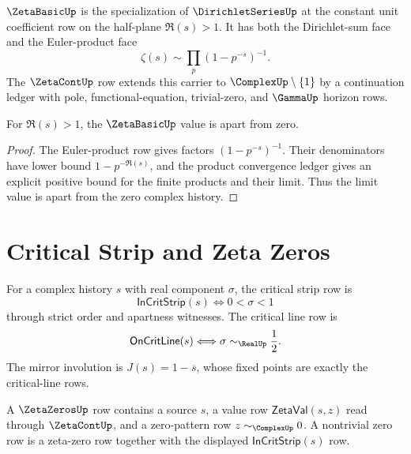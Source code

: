 \begin{definition}
\label{def:number-theory-spine-zeta}
$\ZetaBasicUp$ is the specialization of $\DirichletSeriesUp$ at the constant
unit coefficient row on the half-plane $\Re(s)>1$.  It has both the
Dirichlet-sum face and the Euler-product face
$$
\zeta(s)\sim\prod_p(1-p^{-s})^{-1}.
$$
The $\ZetaContUp$ row extends this carrier to $\ComplexUp\setminus\{1\}$ by a
continuation ledger with pole, functional-equation, trivial-zero, and
$\GammaUp$ horizon rows.
\end{definition}

\begin{theorem}
\label{thm:number-theory-spine-zeta-nonvanishing-half-plane}
For $\Re(s)>1$, the $\ZetaBasicUp$ value is apart from zero.
\end{theorem}

\begin{proof}
The Euler-product row gives factors $(1-p^{-s})^{-1}$.  Their denominators
have lower bound $1-p^{-\Re(s)}$, and the product convergence ledger gives an
explicit positive bound for the finite products and their limit.  Thus the
limit value is apart from the zero complex history.
\end{proof}

\section{Critical Strip and Zeta Zeros}
\label{sec:number-theory-spine-zero-ledger}

\begin{definition}
\label{def:number-theory-spine-critical-strip}
For a complex history $s$ with real component $\sigma$, the critical strip row
is
$$
\mathsf{InCritStrip}(s)
\Longleftrightarrow
0<\sigma<1
$$
through strict order and apartness witnesses.  The critical line row is
$$
\mathsf{OnCritLine}(s)
\Longleftrightarrow
\sigma\sim_{\RealUp}\frac12.
$$
The mirror involution is $J(s)=1-\overline{s}$, whose fixed points are exactly
the critical-line rows.
\end{definition}

\begin{definition}
\label{def:number-theory-spine-zeta-zero}
A $\ZetaZerosUp$ row contains a source $s$, a value row
$\mathsf{ZetaVal}(s,z)$ read through $\ZetaContUp$, and a zero-pattern row
$z\sim_{\ComplexUp}0$.  A nontrivial zero row is a zeta-zero row together with
the displayed $\mathsf{InCritStrip}(s)$ row.
\end{definition}

